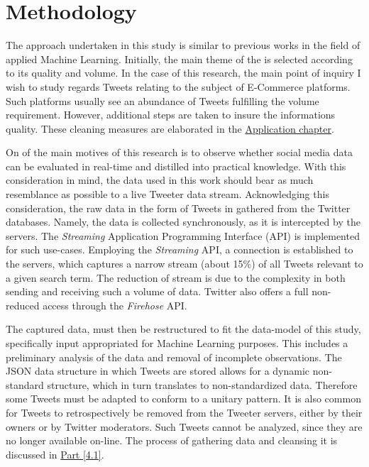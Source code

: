 \section{Methodology}
	The approach undertaken in this study is similar to previous works in the field of applied Machine Learning. Initially, the main theme of the is selected according to its quality and volume. In the case of this research, the main point of inquiry I wish to study regards Tweets relating to the subject of E-Commerce platforms. Such platforms usually see an abundance of Tweets fulfilling the volume requirement. However, additional steps are taken to insure the informations quality. These cleaning measures are elaborated in the \hyperref[Application]{Application chapter}.
	\par
	On of the main motives of this research is to observe whether social media data can be evaluated in real-time and distilled into practical knowledge. With this consideration in mind, the data used in this work should bear as much resemblance as possible to a live Tweeter data stream. Acknowledging this consideration, the raw data in the form of Tweets in gathered from the Twitter databases. Namely, the data is collected synchronously, as it is intercepted by the servers. The \textit{Streaming} Application Programming Interface (API)\cite{stream_api} is implemented for such use-cases. Employing the \textit{Streaming} API, a connection is established to the servers, which captures a narrow stream (about 15\%) of all Tweets relevant to a given search term. The reduction of stream is due to the complexity in both sending and receiving such a volume of data. Twitter also offers a full non-reduced access through the \textit{Firehose} API.
	\par
	The captured data, must then be restructured to fit the data-model of this study, specifically input appropriated for Machine Learning purposes. This includes a preliminary analysis of the data and removal of incomplete observations. The JSON data structure in which Tweets are stored allows for a dynamic non-standard structure, which in turn translates to non-standardized data. Therefore some Tweets must be adapted to conform to a unitary pattern. It is also common for Tweets to retrospectively be removed from the Tweeter servers, either by their owners or by Twitter moderators. Such Tweets cannot be analyzed, since they are no longer available on-line. The process of gathering data and cleansing it is discussed in \hyperref[sec:collect_data]{Part [4.1]}.
	\par

